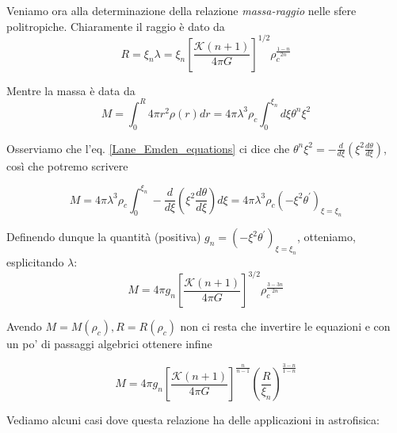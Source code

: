 \documentclass{report}
\begin{document}
    \vspace{1cm}

    Veniamo ora alla determinazione della relazione \emph{massa-raggio} nelle sfere politropiche. 
    Chiaramente il raggio è dato da 
    \begin{equation}
        R = \xi_n\lambda = \xi_n\left[\frac{\mathcal{K}(n+1)}{4\pi G}\right]^{1/2}\rho_c^{\frac{1-n}{2n}}
    \end{equation}

    Mentre la massa è data da 
    \begin{equation}
        M = \int_0^R 4\pi r^2 \rho(r)dr = 4\pi \lambda^3 \rho_c \int_0^{\xi_n}d\xi\theta^n\xi^2
    \end{equation}

    Osserviamo che l'eq. \ref{Lane_Emden_equations} ci dice che $\theta^n\xi^2 = -\frac{d}{d\xi}\left(\xi^2\frac{d\theta}{d\xi} \right)$, così che potremo scrivere

    \begin{equation}
        M = 4\pi \lambda^3 \rho_c \int_0^{\xi_n} -\frac{d}{d\xi}\left(\xi^2\frac{d\theta}{d\xi} \right)d\xi = 4\pi \lambda^3\rho_c \left(-\xi^2 \theta^{'} \right)_{\xi = \xi_n}
    \end{equation}

    Definendo dunque la quantità (positiva) $g_n = \left(-\xi^2 \theta^{'} \right)_{\xi = \xi_n}$, otteniamo, esplicitando $\lambda$: 
    \begin{equation}
        M = 4\pi g_n\left[\frac{\mathcal{K}(n+1)}{4\pi G}\right]^{3/2}\rho_c^{\frac{3-3n}{2n}}
    \end{equation}

    Avendo $M=M(\rho_c), R = R(\rho_c)$ non ci resta che invertire le equazioni e con un po' di passaggi algebrici ottenere infine
    \begin{tcolorbox}[colback=myg!15, colframe=black, boxrule=1pt]
    \begin{equation}
        \label{mass_radius_politropic}
        M = 4\pi g_n \left[\frac{\mathcal{K}(n+1)}{4\pi G}\right]^{\frac{n}{n-1}}\left(\frac{R}{\xi_n} \right)^{\frac{3-n}{1-n}}
    \end{equation}
    \end{tcolorbox}

    Vediamo alcuni casi dove questa relazione ha delle applicazioni in astrofisica: 
\end{document}
